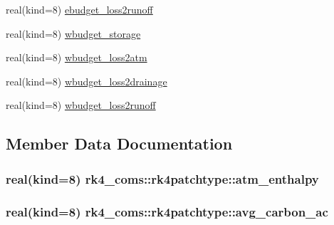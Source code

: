 \begin{DoxyCompactItemize}
real(kind=8) \hyperlink{structrk4__coms_1_1rk4patchtype_a8fc0d8ee10c1514c9ec0f1170dedab04}{ebudget\+\_\+loss2runoff}
\item 
real(kind=8) \hyperlink{structrk4__coms_1_1rk4patchtype_a8353e7ef490e77bb14d49b4c6151e1d9}{wbudget\+\_\+storage}
\item 
real(kind=8) \hyperlink{structrk4__coms_1_1rk4patchtype_a1ac1fd5a180e1c1b79dbce1f2bb6fe8b}{wbudget\+\_\+loss2atm}
\item 
real(kind=8) \hyperlink{structrk4__coms_1_1rk4patchtype_a75224b0fce27f5ff820fc0b2b55cb8fc}{wbudget\+\_\+loss2drainage}
\item 
real(kind=8) \hyperlink{structrk4__coms_1_1rk4patchtype_aa85e77ba1392352ea0c61466b5d6b542}{wbudget\+\_\+loss2runoff}
\end{DoxyCompactItemize}


\subsection{Member Data Documentation}
\subsubsection[{\texorpdfstring{atm\+\_\+enthalpy}{atm_enthalpy}}]{\setlength{\rightskip}{0pt plus 5cm}real(kind=8) rk4\+\_\+coms\+::rk4patchtype\+::atm\+\_\+enthalpy}\hypertarget{structrk4__coms_1_1rk4patchtype_a79ae2ab2774fdd900ec72046deff600b}{}\label{structrk4__coms_1_1rk4patchtype_a79ae2ab2774fdd900ec72046deff600b}
\subsubsection[{\texorpdfstring{avg\+\_\+carbon\+\_\+ac}{avg_carbon_ac}}]{\setlength{\rightskip}{0pt plus 5cm}real(kind=8) rk4\+\_\+coms\+::rk4patchtype\+::avg\+\_\+carbon\+\_\+ac}\hypertarget{structrk4__coms_1_1rk4patchtype_ad6e6550176dfb89feebfd941165e2449}{}\label{structrk4__coms_1_1rk4patchtype_ad6e6550176dfb89feebfd941165e2449}

